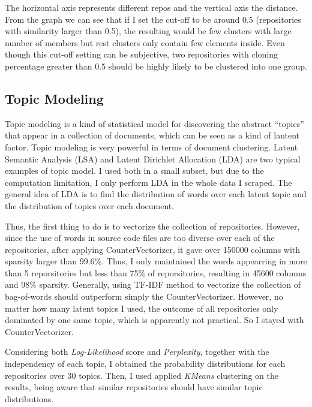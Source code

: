 The horizontal axis represents different repos and the vertical axis the
distance. From the graph we can see that if I set the cut-off to be
around 0.5 (repositories with similarity larger than 0.5), the resulting
would be few clusters with large number of members but rest clusters
only contain few elements inside. Even though this cut-off setting can
be subjective, two repositories with cloning percentage greater than 0.5
should be highly likely to be clustered into one group.

\hypertarget{topic-modeling}{%
\subsection{Topic Modeling}\label{topic-modeling}}

Topic modeling is a kind of statistical model for discovering the
abstract ``topics'' that appear in a collection of documents, which can
be seen as a kind of lantent factor. Topic modeling is very powerful in
terms of document clustering. Latent Semantic Analysis (LSA) and Latent
Dirichlet Allocation (LDA) are two typical examples of topic model. I
used both in a small subset, but due to the computation limitation, I
only perform LDA in the whole data I scraped. The general idea of LDA is
to find the distribution of words over each latent topic and the
distribution of topics over each document.

Thus, the first thing to do is to vectorize the collection of
repositories. However, since the use of words in source code files are
too diverse over each of the repositories, after applying
CounterVectorizer, it gave over 150000 columns with sparsity larger than
99.6\%. Thus, I only maintained the words appearring in more than 5
reporsitories but less than 75\% of reporsitories, resulting in 45600
columns and 98\% sparsity. Generally, using TF-IDF method to vectorize
the collection of bag-of-words should outperform simply the
CounterVectorizer. However, no matter how many latent topics I used, the
outcome of all repositories only dominated by one same topic, which is
apparently not practical. So I stayed with CounterVectorizer.

Considering both \emph{Log-Likelihood} score and \emph{Perplexity},
together with the independency of each topic, I obtained the probability
distributions for each repositories over 30 topics. Then, I used applied
\emph{KMeans} clustering on the results, being aware that similar
repositories should have similar topic distributions.

